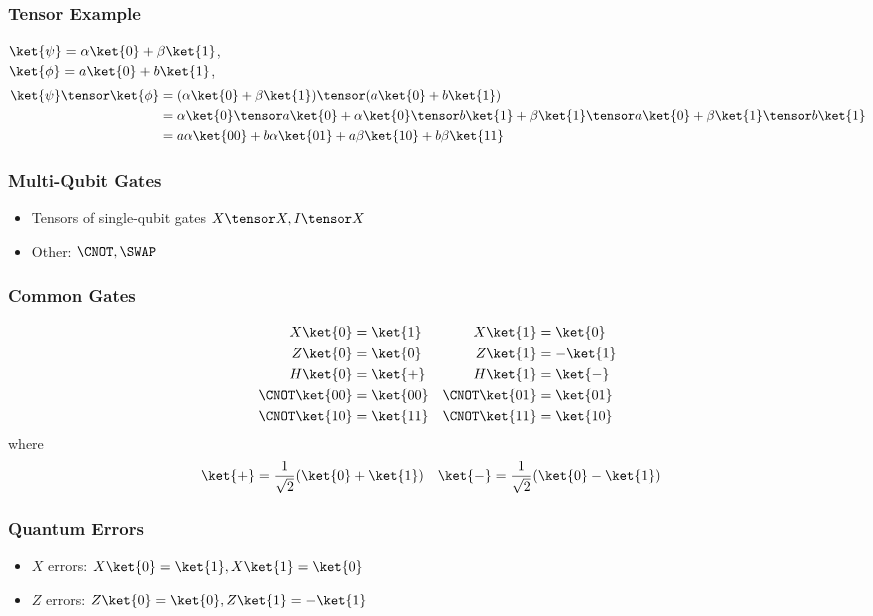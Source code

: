 \documentclass[notheorems]{beamer}
\begin{document}
\begin{frame}
\frametitle{Tensor Example}
$\ket{\psi} = \alpha \ket{0} + \beta \ket{1}$,\\
$\ket{\phi} = a \ket{0} + b \ket{1}$,\pause
\begin{align*}
\ket{\psi} \tensor \ket{\phi} 
&= (\alpha \ket{0} + \beta \ket{1}) \tensor (a \ket{0} + b \ket{1})\\ 
&= \alpha \ket{0} \tensor a \ket{0} + \alpha \ket{0} \tensor b \ket{1} + \beta \ket{1} \tensor a \ket{0} + \beta \ket{1} \tensor b \ket{1}\\ 
&= a \alpha \ket{00} + b \alpha \ket{01} + a \beta \ket{10} + b \beta \ket{11} 
\end{align*}
\end{frame}

\begin{frame}
\frametitle{Multi-Qubit Gates}
\begin{itemize}
\item Tensors of single-qubit gates $X \tensor X, I \tensor X$ \pause
\item Other: $\CNOT, \SWAP$
\end{itemize}
\end{frame}

\begin{frame}
\frametitle{Common Gates}
\begin{align*}
X \ket{0} &= \ket{1} & X \ket{1} &= \ket{0}\\
Z \ket{0} &= \ket{0} & Z \ket{1} &= -\ket{1}\\
H \ket{0} &= \ket{+} & H \ket{1} &= \ket{-}\\ 
\CNOT \ket{00} &= \ket{00} & \CNOT \ket{01} &= \ket{01}\\
\CNOT \ket{10} &= \ket{11} & \CNOT \ket{11} &= \ket{10}
\end{align*}
where 
\begin{align*}
\ket{+} &= \frac{1}{\sqrt{2}} ( \ket{0} + \ket{1}) & \ket{-} &= \frac{1}{\sqrt{2}} (\ket{0} - \ket{1})
\end{align*}
\end{frame}


\begin{frame}
\frametitle{Quantum Errors}
\begin{itemize}
\item $X$ errors: $X\ket{0} = \ket{1}, X\ket{1} = \ket{0}$ \pause
\item $Z$ errors: $Z\ket{0} = \ket{0}, Z\ket{1} = -\ket{1}$
\end{itemize}
\end{frame}
\end{document}
